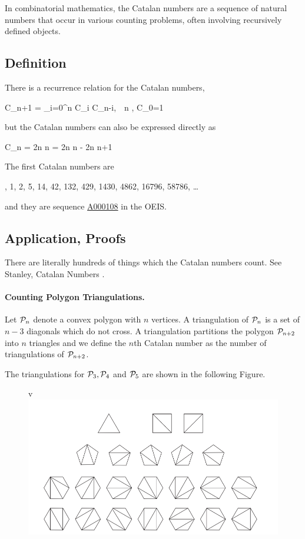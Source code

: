 
In combinatorial mathematics, the Catalan numbers are a sequence of natural numbers that occur in various counting problems, often involving recursively defined objects.

\subsection{Definition}

There is a recurrence relation for the Catalan numbers,

\be\label{2022-06-15:eq1}
C_{n+1} = \sum_{i=0}^n C_i C_{n-i}, \,\, n , \quad C_0=1
\ee

but the Catalan numbers can also be expressed directly as

\bee
C_n =  {2n \choose n} = {2n \choose n} - {2n \choose n+1}
\eee

The first Catalan numbers are

, 1, 2, 5, 14, 42, 132, 429, 1430, 4862, 16796, 58786, \ldots
\eee

and they are sequence \href{https://oeis.org/A000108}{A000108} in the OEIS.

\subsection{Application, Proofs}

There are literally hundreds of things which the Catalan numbers count. See Stanley, Catalan Numbers .

\paragraph{Counting Polygon Triangulations.} Let $\mathcal{P}_n$ denote a convex polygon with $n$ vertices. A triangulation of $\mathcal{P}_n$ is a set of $n-3$ diagonals which do not cross. A triangulation partitions the polygon $\mathcal{P}_{n+2}$ into $n$ triangles and we define the $n$th Catalan number as the number of triangulations of $\mathcal{P}_{n+2}$.

The triangulations for $\mathcal{P}_3, \mathcal{P}_4$ and $\mathcal{P}_5$ are shown in the following Figure.

\begin{figure}[H]v
\centering
\includegraphics[scale=0.5]{images/2022-06-15-catalan_01.png}
\end{figure}


